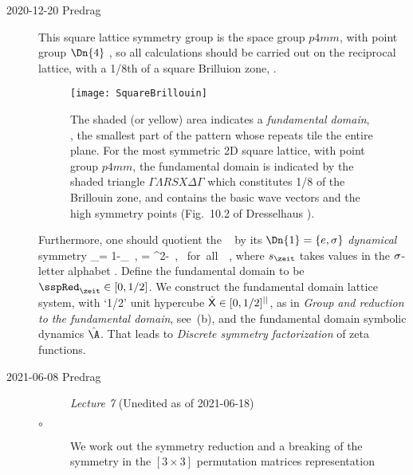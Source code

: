 \begin{description}
\item[2020-12-20 Predrag]
This square lattice symmetry group is the space group $p4mm$, with point
group $\Dn{4}$ , so all calculations should be
carried out on the reciprocal lattice, with a 1/8th of a square Brilluion
zone, .

\begin{figure}
  \centering
\texttt{[image: SquareBrillouin]}
  \caption{
The shaded (or yellow) area indicates a \emph{fundamental domain}, \ie, the
smallest part of the pattern whose repeats tile the entire plane.
For the most symmetric 2D square lattice, with point group $p4mm$, the
{fundamental domain} is indicated by the shaded triangle $\Gamma\Lambda
RSX\Delta\Gamma$ which constitutes 1/8 of the Brillouin zone, and contains
the basic wave vectors and the high symmetry points
(Fig.~10.2 of Dresselhaus \etal{}).
  }\label{fig:SquareBrillouin}
\end{figure}

Furthermore, one should quotient the \templatt\  by its
$\Dn{1}=\{e,\sigma\}$ \emph{dynamical} symmetry
\beq
\sigma \ssp_\zeit = 1-\ssp_\zeit
    \,,\quad
\sigma \Ssym{\zeit} = {\mu}^2-\Ssym{\zeit}
    \,,\qquad
\mbox{ for all } \zeit\in\integers
\,,
where $\Ssym{\zeit}$ takes values in the $\sigma$-letter alphabet
.
Define the fundamental domain to be ${\sspRed}_\zeit\in[0,1/2]$.
We construct the
{\templatt} fundamental domain lattice system, with `1/2' unit hypercube
$\hat{\mathsf{X}}\in[0,1/2]^{||}$, as in
{{\em Group  and reduction to the fundamental domain}},
see \,(b),
and the fundamental domain symbolic dynamics $\hat{\A}$.
That leads to
 \emph{Discrete symmetry
factorization} of zeta functions.

\item[2021-06-08 Predrag]

    \begin{description}
        \item[
        {}] {\em
Lecture 7} (Unedited as of 2021-06-18)
        \item[$\circ$]
We work out the symmetry reduction and a breaking of the  symmetry in the
$[3\times3]$ permutation matrices representation
    \end{description}


\end{description}
